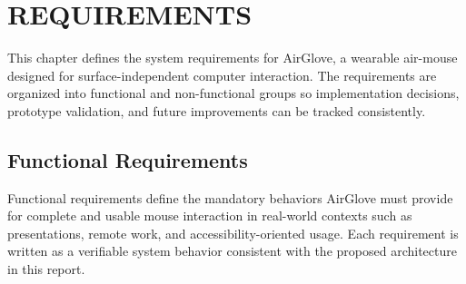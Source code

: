 \chapter{REQUIREMENTS}

This chapter defines the system requirements for AirGlove, a wearable air-mouse designed for surface-independent computer interaction. The requirements are organized into functional and non-functional groups so implementation decisions, prototype validation, and future improvements can be tracked consistently.

\section{Functional Requirements}

Functional requirements define the mandatory behaviors AirGlove must provide for complete and usable mouse interaction in real-world contexts such as presentations, remote work, and accessibility-oriented usage. Each requirement is written as a verifiable system behavior consistent with the proposed architecture in this report.

